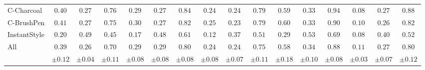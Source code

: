 \begin{table*}
{\begin{tabular}{l | c c c | c c c | c c c | c c c | c c c}
    C-Charcoal & $0.40$ & $0.27$ & $\mathbf{0.76}$ & $0.29$ & $0.27$ & $\mathbf{0.84}$ & $0.24$ & $0.24$ & $\mathbf{0.79}$ & $0.59$ & $0.33$ & $\mathbf{0.94}$ & $0.08$ & $0.27$ & $\mathbf{0.88}$ \\
    C-BrushPen & $0.41$ & $0.27$ & $\mathbf{0.75}$ & $0.30$ & $0.27$ & $\mathbf{0.82}$ & $0.25$ & $0.23$ & $\mathbf{0.79}$ & $0.60$ & $0.33$ & $\mathbf{0.90}$ & $0.10$ & $0.26$ & $\mathbf{0.82}$ \\
    InstantStyle & $ 0.20 $ & $\mathbf{0.49} $ & $0.45$ & $0.17 $ & $0.48 $ & $\mathbf{0.61} $ & $0.12 $ & $0.37 $ & $\mathbf{0.51} $ & $0.29$ & $0.53$ & $\mathbf{0.69}$ & $0.08$ & $0.40$ & $\mathbf{0.52}$ \\
    \midrule
     All & $	0.39 $ & $0.26 $ & $\mathbf{0.70}$ & $0.29 $ & $0.29 $ & $\mathbf{0.80 }$ & $0.24 $ & $0.24 $ & $\mathbf{0.75 }$ & $0.58$ & $0.34$ & $\mathbf{0.88}$ & $0.11$ & $0.27$ & $\mathbf{0.80}$ \\
    & \footnotesize{$\pm 0.12 $} & \footnotesize{$\pm 0.04$} & \footnotesize{$\pm 0.11$} & \footnotesize{$\pm 0.08$} & \footnotesize{$\pm 0.08$} & \footnotesize{$\pm 0.08$} & \footnotesize{$\pm 0.08$} & \footnotesize{$\pm 0.07$} & \footnotesize{$\pm 0.11$} & \footnotesize{$\pm 0.18$} &  \footnotesize{$\pm 0.10$} & \footnotesize{$\pm 0.08$}& \footnotesize{$\pm 0.03$} & \footnotesize{$\pm 0.07$} &  \footnotesize{$\pm 0.12$} \\
    \bottomrule
\end{tabular}
%
}
\end{table*}
